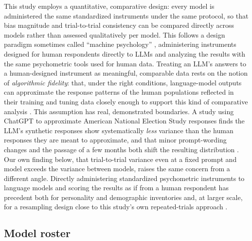 \documentclass[12pt]{article}
\begin{document}
This study employs a quantitative, comparative design: every model is
administered the same standardized instruments under the same protocol, so
that bias magnitude and trial-to-trial consistency can be compared directly
across models rather than assessed qualitatively per model. This follows a
design paradigm sometimes called ``machine psychology''
\citep{hagendorff2023}, administering instruments designed for human
respondents directly to LLMs and analyzing the results with the same
psychometric tools used for human data. Treating an LLM's answers to a
human-designed instrument as meaningful, comparable data rests on the
notion of \emph{algorithmic fidelity}: that, under the right conditions,
language-model outputs can approximate the response patterns of the human
populations reflected in their training and tuning data closely enough to
support this kind of comparative analysis \citep{argyle2023}. This
assumption has real, demonstrated boundaries. A study using ChatGPT to
approximate American National Election Study responses finds the LLM's
synthetic responses show systematically \emph{less} variance than the
human responses they are meant to approximate, and that minor
prompt-wording changes and the passage of a few months both shift the
resulting distribution \citep{bisbee2024}. Our own finding below, that
trial-to-trial variance even at a fixed prompt and model exceeds the
variance between models, raises the same concern from a different angle.
Directly administering standardized psychometric
instruments to language models and scoring the results as if from a human
respondent has precedent both for personality and demographic inventories
\citep{miotto2022} and, at larger scale, for a resampling design close to
this study's own repeated-trials approach \citep{serapiogarcia2023}.

\subsection{Model roster}
\end{document}
